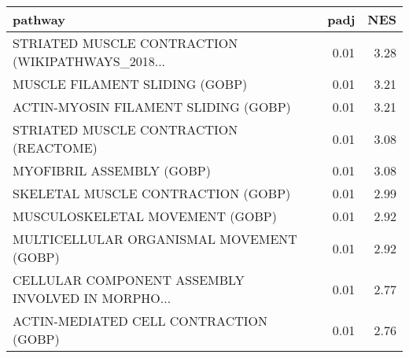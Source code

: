 \begin{tabular}{lrr}
\toprule
                                           pathway &  padj &   NES \\
\midrule
 STRIATED MUSCLE CONTRACTION (WIKIPATHWAYS\_2018... &  0.01 &  3.28 \\
                    MUSCLE FILAMENT SLIDING (GOBP) &  0.01 &  3.21 \\
              ACTIN-MYOSIN FILAMENT SLIDING (GOBP) &  0.01 &  3.21 \\
            STRIATED MUSCLE CONTRACTION (REACTOME) &  0.01 &  3.08 \\
                         MYOFIBRIL ASSEMBLY (GOBP) &  0.01 &  3.08 \\
                SKELETAL MUSCLE CONTRACTION (GOBP) &  0.01 &  2.99 \\
                   MUSCULOSKELETAL MOVEMENT (GOBP) &  0.01 &  2.92 \\
          MULTICELLULAR ORGANISMAL MOVEMENT (GOBP) &  0.01 &  2.92 \\
 CELLULAR COMPONENT ASSEMBLY INVOLVED IN MORPHO... &  0.01 &  2.77 \\
            ACTIN-MEDIATED CELL CONTRACTION (GOBP) &  0.01 &  2.76 \\
\bottomrule
\end{tabular}
